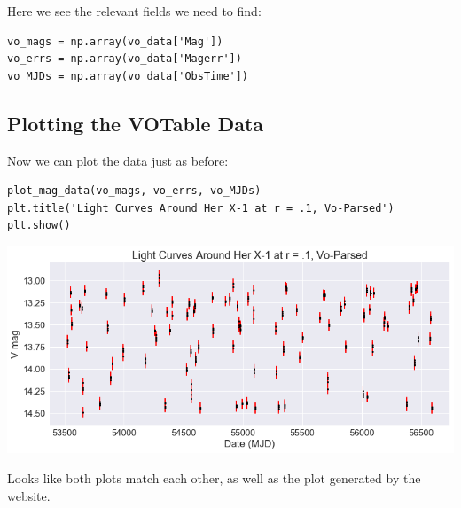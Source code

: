 \documentclass[11pt]{article}
\begin{document}
Here we see the relevant fields we need to find:

\begin{verbatim}
vo_mags = np.array(vo_data['Mag'])
vo_errs = np.array(vo_data['Magerr'])
vo_MJDs = np.array(vo_data['ObsTime'])
\end{verbatim}

\subsection*{Plotting the VOTable Data}
\label{sec-5-1}

Now we can plot the data just as before:

\begin{verbatim}
plot_mag_data(vo_mags, vo_errs, vo_MJDs)
plt.title('Light Curves Around Her X-1 at r = .1, Vo-Parsed')
plt.show()
\end{verbatim}

\includegraphics[width=.9\linewidth]{./obipy-resources/17087w4i.png}



Looks like both plots match each other, as well as the plot generated by the website.
\end{document}
